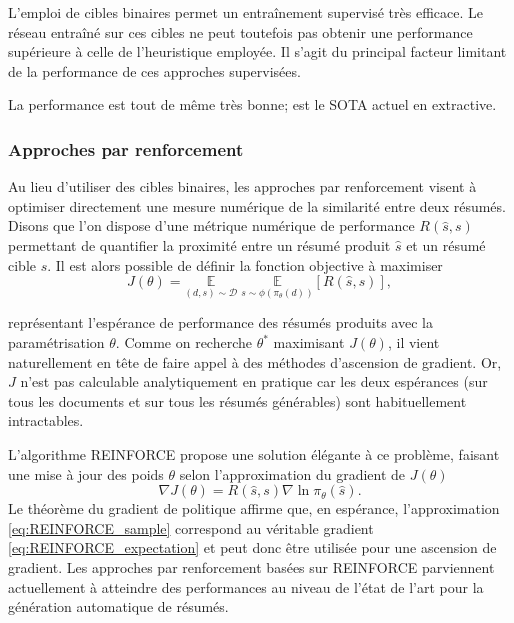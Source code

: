 L'emploi de cibles binaires permet un entraînement supervisé très efficace.
Le réseau entraîné sur ces cibles ne peut toutefois pas obtenir une performance
supérieure à celle de l'heuristique employée.
Il s'agit du principal facteur limitant de la performance de ces approches supervisées.

La performance est tout de même très bonne; \citep{zhong-etal-2020-extractive} est le SOTA
actuel en extractive.

\subsubsection*{Approches par renforcement}

Au lieu d'utiliser des cibles binaires, les approches par renforcement visent à
optimiser directement une mesure numérique de la similarité entre deux résumés.
Disons que l'on dispose d'une métrique numérique de performance $R(\hat{s}, s)$
permettant de quantifier la proximité entre un résumé produit $\hat{s}$ et un résumé
cible $s$.
Il est alors possible de définir la fonction objective à maximiser
\begin{equation}
    J(\theta) = \underset{(d,s) \sim \mathcal{D}}{\mathbb{E}} \; \underset{s \sim \phi(\pi_\theta(d))}{\mathbb{E}} \left[R(\hat{s}, s) \right],
    \label{eq:REINFORCE_expectation}
\end{equation}

représentant l'espérance de performance des résumés produits avec la paramétrisation $\theta$.
Comme on recherche $\theta^*$ maximisant $J(\theta)$, il vient naturellement en tête
de faire appel à des méthodes d'ascension de gradient.
Or, $J$ n'est pas calculable analytiquement en pratique car les deux espérances (sur
tous les documents et sur tous les résumés générables) sont habituellement intractables.


L'algorithme REINFORCE \citep{williams1992simple} propose une
solution élégante à ce problème, faisant une mise à jour des poids $\theta$ selon l'approximation du gradient
de $J(\theta)$
\begin{equation}
    \nabla J(\theta) = R(\hat{s}, s)\nabla \ln \pi_\theta (\hat{s}).
    \label{eq:REINFORCE_sample}
\end{equation}
Le théorème du gradient de politique \citep{sutton1999policy} affirme que, en espérance,
l'approximation \ref{eq:REINFORCE_sample} correspond au véritable gradient \ref{eq:REINFORCE_expectation}
et peut donc être utilisée pour une ascension de gradient.
Les approches par renforcement basées sur REINFORCE \citep{dong2018banditsum,luo-etal-2019-reading}
parviennent actuellement à atteindre des performances au niveau de l'état
de l'art pour la génération automatique de résumés.

